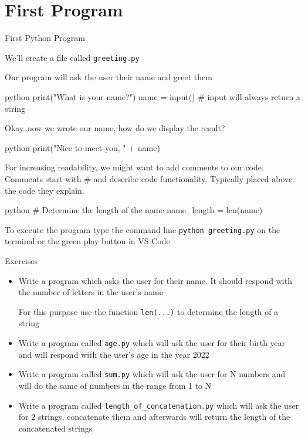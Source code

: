 \documentclass[
	11pt, 
]{beamer}
\begin{document}
\section{First Program}
\small
\begin{frame}[fragile]{First Python Program}

We'll create a file called \texttt{greeting.py}

Our program will ask the user their name and greet them

\pause


\begin{mintedbox}{python}
print("What is your name?")
name = input() # input will always return a string
\end{mintedbox}

Okay..now we wrote our name, how do we display the result?

\pause
\begin{mintedbox}{python}
print("Nice to meet you, " + name)
\end{mintedbox}


For increasing readability, we might want to add comments to our code.
Comments start with # and describe code functionality.
Typically placed above the code they explain.

\begin{mintedbox}{python}
# Determine the length of the name
name_length = len(name)
\end{mintedbox}


To execute the program type the command line \texttt{python greeting.py} on the terminal or the green play button in VS Code
    
\end{frame}



\begin{frame}{Exercises}


\begin{itemize}
    \item Write a program which asks the user for their name. It should respond with the number of letters in the user's name

    For this purpose use the function \texttt{len(...)} to determine the length of a string

    \item Write a program called \texttt{age.py} which will ask the user for their birth year and will respond with the user's age in the year 2022

    \item Write a program called \texttt{sum.py} which will ask the user for N numbers and will do the same of numbers in the range from 1 to N

    \item Write a program called \texttt{length\_of\_concatenation.py} which will ask the user for 2 strings, concatenate them and afterwards will return the length of the concatenated strings
\end{itemize}

\end{frame}
\end{document}
